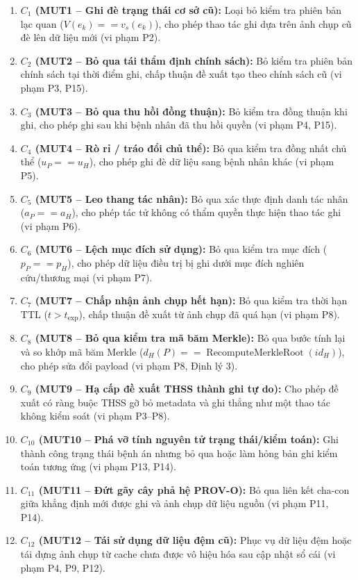 \documentclass[11pt]{article}
\begin{document}
\begin{enumerate}
    \item \textbf{$C_1$ (MUT1 -- Ghi đè trạng thái cơ sở cũ):} Loại bỏ kiểm tra phiên bản lạc quan ($V(e_k) == v_s(e_k)$), cho phép thao tác ghi dựa trên ảnh chụp cũ đè lên dữ liệu mới (vi phạm P2).
    \item \textbf{$C_2$ (MUT2 -- Bỏ qua tái thẩm định chính sách):} Bỏ kiểm tra phiên bản chính sách tại thời điểm ghi, chấp thuận đề xuất tạo theo chính sách cũ (vi phạm P3, P15).
    \item \textbf{$C_3$ (MUT3 -- Bỏ qua thu hồi đồng thuận):} Bỏ kiểm tra đồng thuận khi ghi, cho phép ghi sau khi bệnh nhân đã thu hồi quyền (vi phạm P4, P15).
    \item \textbf{$C_4$ (MUT4 -- Rò rỉ / tráo đổi chủ thể):} Bỏ qua kiểm tra đồng nhất chủ thể ($u_P == u_H$), cho phép ghi đè dữ liệu sang bệnh nhân khác (vi phạm P5).
    \item \textbf{$C_5$ (MUT5 -- Leo thang tác nhân):} Bỏ qua xác thực định danh tác nhân ($a_P == a_H$), cho phép tác tử không có thẩm quyền thực hiện thao tác ghi (vi phạm P6).
    \item \textbf{$C_6$ (MUT6 -- Lệch mục đích sử dụng):} Bỏ qua kiểm tra mục đích ($p_P == p_H$), cho phép dữ liệu điều trị bị ghi dưới mục đích nghiên cứu/thương mại (vi phạm P7).
    \item \textbf{$C_7$ (MUT7 -- Chấp nhận ảnh chụp hết hạn):} Bỏ qua kiểm tra thời hạn TTL ($t > t_{\text{exp}}$), chấp thuận đề xuất từ ảnh chụp đã quá hạn (vi phạm P8).
    \item \textbf{$C_8$ (MUT8 -- Bỏ qua kiểm tra mã băm Merkle):} Bỏ qua bước tính lại và so khớp mã băm Merkle ($d_H(P) == \operatorname{RecomputeMerkleRoot}(id_H)$), cho phép sửa đổi payload (vi phạm P8, Định lý 3).
    \item \textbf{$C_9$ (MUT9 -- Hạ cấp đề xuất THSS thành ghi tự do):} Cho phép đề xuất có ràng buộc THSS gỡ bỏ metadata và ghi thẳng như một thao tác không kiểm soát (vi phạm P3--P8).
    \item \textbf{$C_{10}$ (MUT10 -- Phá vỡ tính nguyên tử trạng thái/kiểm toán):} Ghi thành công trạng thái bệnh án nhưng bỏ qua hoặc làm hỏng bản ghi kiểm toán tương ứng (vi phạm P13, P14).
    \item \textbf{$C_{11}$ (MUT11 -- Đứt gãy cây phả hệ PROV-O):} Bỏ qua liên kết cha-con giữa khẳng định mới được ghi và ảnh chụp dữ liệu nguồn (vi phạm P11, P14).
    \item \textbf{$C_{12}$ (MUT12 -- Tái sử dụng dữ liệu đệm cũ):} Phục vụ dữ liệu đệm hoặc tái dựng ảnh chụp từ cache chưa được vô hiệu hóa sau cập nhật sổ cái (vi phạm P4, P9, P12).

\end{enumerate}
\end{document}
